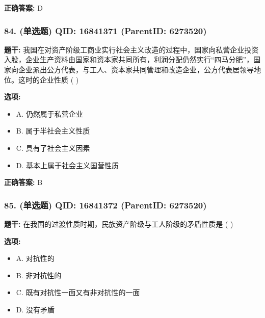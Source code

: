 \documentclass[12pt,UTF8]{ctexart}
\begin{document}
\textbf{正确答案:}
D

\vspace{0.3em}\hrulefill\vspace{0.7em}

\subsubsection*{84. (单选题) \small QID: 16841371 (ParentID: 6273520)}

\textbf{题干:}
我国在对资产阶级工商业实行社会主义改造的过程中，国家向私营企业投资入股，企业生产资料由国家和资本家共同所有，利润分配仍然实行“四马分肥”，国家向企业派出公方代表，与工人、资本家共同管理和改造企业，公方代表居领导地位。这时的企业性质 ( )



\textbf{选项:}
\begin{itemize}[leftmargin=*]

  \item A. 仍然属于私营企业

  \item B. 属于半社会主义性质

  \item C. 具有了社会主义因素

  \item D. 基本上属于社会主义国营性质

\end{itemize}

\textbf{正确答案:}
B

\vspace{0.3em}\hrulefill\vspace{0.7em}

\subsubsection*{85. (单选题) \small QID: 16841372 (ParentID: 6273520)}

\textbf{题干:}
在我国的过渡性质时期，民族资产阶级与工人阶级的矛盾性质是 ( )



\textbf{选项:}
\begin{itemize}[leftmargin=*]

  \item A. 对抗性的

  \item B. 非对抗性的

  \item C. 既有对抗性一面又有非对抗性的一面

  \item D. 没有矛盾

\end{itemize}
\end{document}

